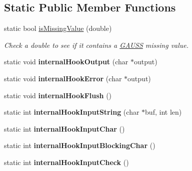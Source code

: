 \subsection*{Static Public Member Functions}
\begin{DoxyCompactItemize}
\item 
static bool \hyperlink{class_g_a_u_s_s_a3e665b3b7d0733f27ca56427e6ec3d49}{is\-Missing\-Value} (double)
\begin{DoxyCompactList}\small\item\em Check a double to see if it contains a \hyperlink{class_g_a_u_s_s}{G\-A\-U\-S\-S} missing value. \end{DoxyCompactList}\item 
\hypertarget{class_g_a_u_s_s_ad907a936da9a60d342898b44bb37188c}{static void {\bfseries internal\-Hook\-Output} (char $\ast$output)}\label{class_g_a_u_s_s_ad907a936da9a60d342898b44bb37188c}

\item 
\hypertarget{class_g_a_u_s_s_addc2a30c69243f368be14bee3ada1761}{static void {\bfseries internal\-Hook\-Error} (char $\ast$output)}\label{class_g_a_u_s_s_addc2a30c69243f368be14bee3ada1761}

\item 
\hypertarget{class_g_a_u_s_s_a269ecd96318af60d348b650849d17c32}{static void {\bfseries internal\-Hook\-Flush} ()}\label{class_g_a_u_s_s_a269ecd96318af60d348b650849d17c32}

\item 
\hypertarget{class_g_a_u_s_s_ae9731be0762c7048f302be63c35827ce}{static int {\bfseries internal\-Hook\-Input\-String} (char $\ast$buf, int len)}\label{class_g_a_u_s_s_ae9731be0762c7048f302be63c35827ce}

\item 
\hypertarget{class_g_a_u_s_s_a67e47c77b2937d46ca7369d7244a86fd}{static int {\bfseries internal\-Hook\-Input\-Char} ()}\label{class_g_a_u_s_s_a67e47c77b2937d46ca7369d7244a86fd}

\item 
\hypertarget{class_g_a_u_s_s_abda34d5de755c678c5789d736480df17}{static int {\bfseries internal\-Hook\-Input\-Blocking\-Char} ()}\label{class_g_a_u_s_s_abda34d5de755c678c5789d736480df17}

\item 
\hypertarget{class_g_a_u_s_s_a24a9bde314967c81afed7a3cb150b94a}{static int {\bfseries internal\-Hook\-Input\-Check} ()}\label{class_g_a_u_s_s_a24a9bde314967c81afed7a3cb150b94a}


\end{DoxyCompactItemize}
